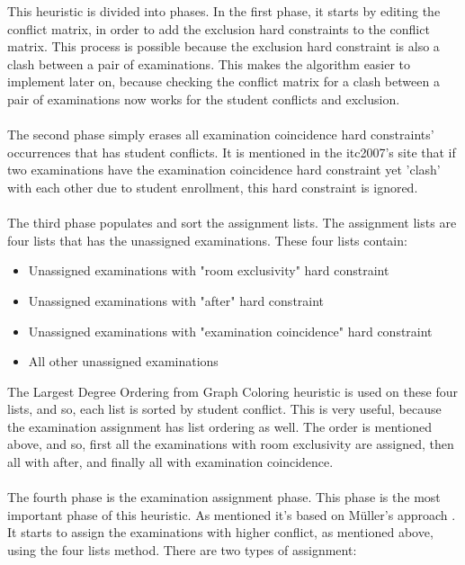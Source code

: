 This heuristic is divided into phases. In the first phase, it starts by editing the conflict matrix, in order to add the exclusion hard constraints to the conflict matrix. This process is possible because the exclusion hard constraint is also a clash between a pair of examinations. This makes the algorithm easier to implement later on, because checking the conflict matrix for a clash between a pair of examinations now works for the student conflicts and exclusion.\\
\\
The second phase simply erases all examination coincidence hard constraints' occurrences that has student conflicts. It is mentioned in the \gls{itc2007}'s site \cite{McCollum2007d} that if two examinations have the examination coincidence hard constraint yet 'clash' with each other due to student enrollment, this hard constraint is ignored.\\
\\
The third phase populates and sort the assignment lists. The assignment lists are four lists that has the unassigned examinations. These four lists contain:
\begin{itemize}
	\item Unassigned examinations with "room exclusivity" hard constraint
	\item Unassigned examinations with "after" hard constraint
	\item Unassigned examinations with "examination coincidence" hard constraint
	\item All other unassigned examinations
\end{itemize}
The Largest Degree Ordering from Graph Coloring heuristic is used on these four lists, and so, each list is sorted by student conflict. This is very useful, because the examination assignment has list ordering as well. The order is mentioned above, and so, first all the examinations with room exclusivity are assigned, then all with after, and finally all with examination coincidence.\\
\\
The fourth phase is the examination assignment phase. This phase is the most important phase of this heuristic. As mentioned it's based on 
M\"{u}ller's approach \cite{Mueller2009}. It starts to assign the examinations with higher conflict, as mentioned above, using the four lists method. There are two types of assignment:
\\
